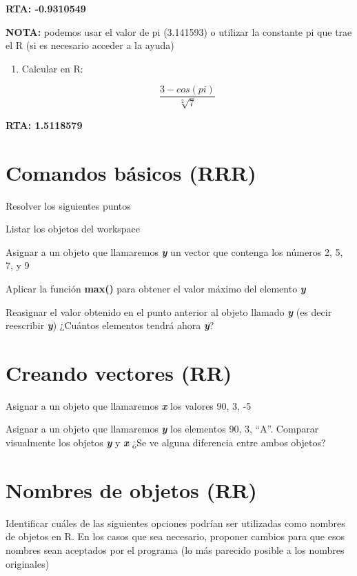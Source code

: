 \documentclass[]{book}
\begin{document}
\textbf{RTA: -0.9310549 }

\textbf{NOTA:} podemos usar el valor de pi (3.141593) o utilizar la constante pi que trae el R (si es necesario acceder a la ayuda)

\begin{enumerate}
\def\labelenumi{\arabic{enumi}.}
\setcounter{enumi}{1}
\item
  Calcular en R:

  \[\frac{3 - cos({pi})} {\sqrt[2]{7}}\]
\end{enumerate}

\textbf{RTA: 1.5118579 }

\hypertarget{comandos-buxe1sicos-rrr}{%
\section{Comandos básicos (RRR)}\label{comandos-buxe1sicos-rrr}}

Resolver los siguientes puntos

Listar los objetos del workspace

Asignar a un objeto que llamaremos \textbf{\emph{y}} un vector que contenga los números 2, 5, 7, y 9

Aplicar la función \textbf{max()} para obtener el valor máximo del elemento \textbf{\emph{y}}

Reasignar el valor obtenido en el punto anterior al objeto llamado \textbf{\emph{y}} (es decir reescribir \textbf{\emph{y}}) ¿Cuántos elementos tendrá ahora \textbf{\emph{y}}?

\hypertarget{creando-vectores-rr}{%
\section{Creando vectores (RR)}\label{creando-vectores-rr}}

Asignar a un objeto que llamaremos \textbf{\emph{x}} los valores 90, 3, -5

Asignar a un objeto que llamaremos \textbf{\emph{y}} los elementos 90, 3, ``A''. Comparar visualmente los objetos \textbf{\emph{y}} y \textbf{\emph{x}} ¿Se ve alguna diferencia entre ambos objetos?

\hypertarget{nombres-de-objetos-rr}{%
\section{Nombres de objetos (RR)}\label{nombres-de-objetos-rr}}

Identificar cuáles de las siguientes opciones podrían ser utilizadas como nombres de objetos en R. En los casos que sea necesario, proponer cambios para que esos nombres sean aceptados por el programa (lo más parecido posible a los nombres originales)
\end{document}
